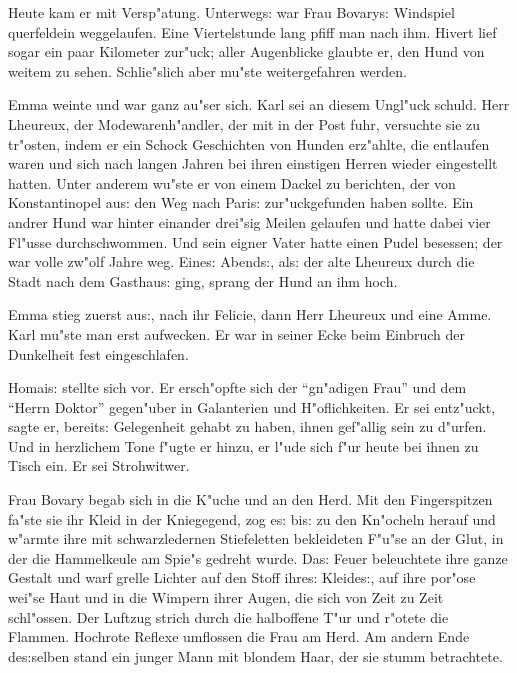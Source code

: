 \documentclass[oneside,12pt]{book}
\newcommand{\s}{s:}%
\begin{document}
Heute kam er mit Versp"atung. Unterweg{\s} war Frau Bovary{\s}
Windspiel querfeldein weggelaufen. Eine Viertelstunde lang pfiff
man nach ihm. Hivert lief sogar ein paar Kilometer zur"uck; aller
Augenblicke glaubte er, den Hund von weitem zu sehen. Schlie"slich
aber mu"ste weitergefahren werden.

Emma weinte und war ganz au"ser sich. Karl sei an diesem Ungl"uck
schuld. Herr Lheureux, der Modewarenh"andler, der mit in der Post
fuhr, versuchte sie zu tr"osten, indem er ein Schock Geschichten
von Hunden erz"ahlte, die entlaufen waren und sich nach langen
Jahren bei ihren einstigen Herren wieder eingestellt hatten. Unter
anderem wu"ste er von einem Dackel zu berichten, der von
Konstantinopel au{\s} den Weg nach Pari{\s} zur"uckgefunden haben
sollte. Ein andrer Hund war hinter einander drei"sig Meilen
gelaufen und hatte dabei vier Fl"usse durchschwommen. Und sein
eigner Vater hatte einen Pudel besessen; der war volle zw"olf
Jahre weg. Eine{\s} Abend{\s}, al{\s} der alte Lheureux durch die
Stadt nach dem Gasthau{\s} ging, sprang der Hund an ihm hoch.


\newpage\begin{center}
{\large \so{Zweite{\s} Kapitel}}\bigskip\bigskip
\end{center}

Emma stieg zuerst au{\s}, nach ihr Felicie, dann Herr Lheureux und
eine Amme. Karl mu"ste man erst aufwecken. Er war in seiner Ecke
beim Einbruch der Dunkelheit fest eingeschlafen.

Homai{\s} stellte sich vor. Er ersch"opfte sich der "`gn"adigen
Frau"' und dem "`Herrn Doktor"' gegen"uber in Galanterien und
H"oflichkeiten. Er sei ent\/z"uckt, sagte er, bereit{\s} Gelegenheit
gehabt zu haben, ihnen gef"allig sein zu d"urfen. Und in
herzlichem Tone f"ugte er hinzu, er l"ude sich f"ur heute bei
ihnen zu Tisch ein. Er sei Strohwitwer.

Frau Bovary begab sich in die K"uche und an den Herd. Mit den
Fingerspitzen fa"ste sie ihr Kleid in der Kniegegend, zog e{\s}
bi{\s} zu den Kn"ocheln herauf und w"armte ihre mit
schwarzledernen Stiefeletten bekleideten F"u"se an der Glut, in
der die Hammelkeule am Spie"s gedreht wurde. Da{\s} Feuer
beleuchtete ihre ganze Gestalt und warf grelle Lichter auf den
Stoff ihre{\s} Kleide{\s}, auf ihre por"ose wei"se Haut und in die
Wimpern ihrer Augen, die sich von Zeit zu Zeit schl"ossen. Der
Luft\/zug strich durch die halboffene T"ur und r"otete die Flammen.
Hochrote Reflexe umflossen die Frau am Herd. Am andern Ende
de{\s}selben stand ein junger Mann mit blondem Haar, der sie stumm
betrachtete.
\end{document}
